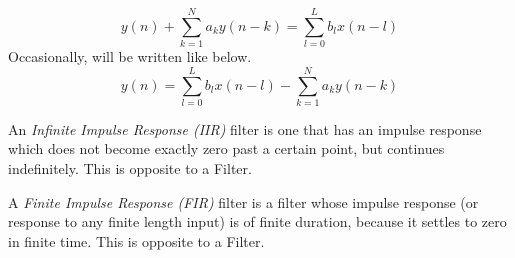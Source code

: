 \begin{equation}\label{eq:General_Difference_Equation}
  y(n) + \sum\limits_{k=1}^{N}a_{k}y(n-k) = \sum\limits_{l=0}^{L}b_{l}x(n-l)
\end{equation}
Occasionally,  will be written like below.
\begin{equation*}
  y(n) = \sum\limits_{l=0}^{L}b_{l}x(n-l) - \sum\limits_{k=1}^{N}a_{k}y(n-k)
\end{equation*}

\begin{definition}\label{def:IIR}
  An \emph{Infinite Impulse Response (IIR)} filter is one that has an impulse response which does not become exactly zero past a certain point, but continues indefinitely.
  This is opposite to a  Filter.
\end{definition}

\begin{definition}\label{def:FIR}
  A \emph{Finite Impulse Response (FIR)} filter is a filter whose impulse response (or response to any finite length input) is of finite duration, because it settles to zero in finite time.
  This is opposite to a  Filter.
\end{definition}

